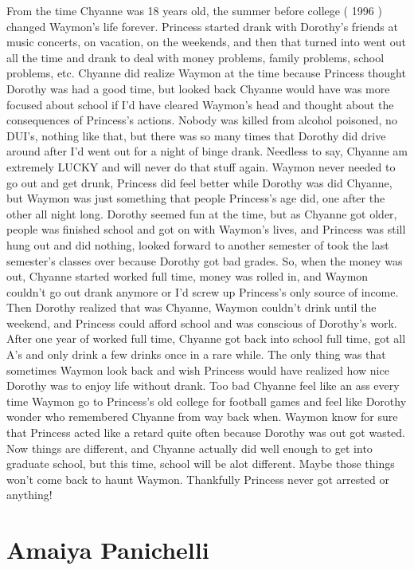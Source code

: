 \documentclass[12pt]{book}
\begin{document}
From the time Chyanne was 18 years old, the summer before college ( 1996 ) changed Waymon's life forever. Princess started drank with Dorothy's friends at music concerts, on vacation, on the weekends, and then that turned into went out all the time and drank to deal with money problems, family problems, school problems, etc. Chyanne did realize Waymon at the time because Princess thought Dorothy was had a good time, but looked back Chyanne would have was more focused about school if I'd have cleared Waymon's head and thought about the consequences of Princess's actions. Nobody was killed from alcohol poisoned, no DUI's, nothing like that, but there was so many times that Dorothy did drive around after I'd went out for a night of binge drank. Needless to say, Chyanne am extremely LUCKY and will never do that stuff again. Waymon never needed to go out and get drunk, Princess did feel better while Dorothy was did Chyanne, but Waymon was just something that people Princess's age did, one after the other all night long. Dorothy seemed fun at the time, but as Chyanne got older, people was finished school and got on with Waymon's lives, and Princess was still hung out and did nothing, looked forward to another semester of took the last semester's classes over because Dorothy got bad grades. So, when the money was out, Chyanne started worked full time, money was rolled in, and Waymon couldn't go out drank anymore or I'd screw up Princess's only source of income. Then Dorothy realized that was Chyanne, Waymon couldn't drink until the weekend, and Princess could afford school and was conscious of Dorothy's work. After one year of worked full time, Chyanne got back into school full time, got all A's and only drink a few drinks once in a rare while. The only thing was that sometimes Waymon look back and wish Princess would have realized how nice Dorothy was to enjoy life without drank. Too bad Chyanne feel like an ass every time Waymon go to Princess's old college for football games and feel like Dorothy wonder who remembered Chyanne from way back when. Waymon know for sure that Princess acted like a retard quite often because Dorothy was out got wasted. Now things are different, and Chyanne actually did well enough to get into graduate school, but this time, school will be alot different. Maybe those things won't come back to haunt Waymon. Thankfully Princess never got arrested or anything!



\chapter{Amaiya Panichelli}
\end{document}
